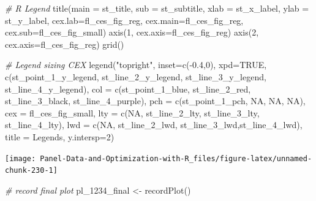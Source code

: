 \documentclass[
]{book}
\newenvironment{Shaded}{\begin{snugshade}}{\end{snugshade}}
\newcommand{\AttributeTok}[1]{\textcolor[rgb]{0.77,0.63,0.00}{#1}}
\newcommand{\CommentTok}[1]{\textcolor[rgb]{0.56,0.35,0.01}{\textit{#1}}}
\newcommand{\ConstantTok}[1]{\textcolor[rgb]{0.00,0.00,0.00}{#1}}
\newcommand{\DecValTok}[1]{\textcolor[rgb]{0.00,0.00,0.81}{#1}}
\newcommand{\FloatTok}[1]{\textcolor[rgb]{0.00,0.00,0.81}{#1}}
\newcommand{\FunctionTok}[1]{\textcolor[rgb]{0.00,0.00,0.00}{#1}}
\newcommand{\NormalTok}[1]{#1}
\newcommand{\OtherTok}[1]{\textcolor[rgb]{0.56,0.35,0.01}{#1}}
\newcommand{\SpecialCharTok}[1]{\textcolor[rgb]{0.00,0.00,0.00}{#1}}
\newcommand{\StringTok}[1]{\textcolor[rgb]{0.31,0.60,0.02}{#1}}
\begin{document}
\begin{Shaded}
\begin{Highlighting}[]
\CommentTok{\# R Legend}
\FunctionTok{title}\NormalTok{(}\AttributeTok{main =}\NormalTok{ st\_title, }\AttributeTok{sub =}\NormalTok{ st\_subtitle, }\AttributeTok{xlab =}\NormalTok{ st\_x\_label, }\AttributeTok{ylab =}\NormalTok{ st\_y\_label,}
      \AttributeTok{cex.lab=}\NormalTok{fl\_ces\_fig\_reg,}
      \AttributeTok{cex.main=}\NormalTok{fl\_ces\_fig\_reg,}
      \AttributeTok{cex.sub=}\NormalTok{fl\_ces\_fig\_small)}
\FunctionTok{axis}\NormalTok{(}\DecValTok{1}\NormalTok{, }\AttributeTok{cex.axis=}\NormalTok{fl\_ces\_fig\_reg)}
\FunctionTok{axis}\NormalTok{(}\DecValTok{2}\NormalTok{, }\AttributeTok{cex.axis=}\NormalTok{fl\_ces\_fig\_reg)}
\FunctionTok{grid}\NormalTok{()}

\CommentTok{\# Legend sizing CEX}
\FunctionTok{legend}\NormalTok{(}\StringTok{"topright"}\NormalTok{,}
       \AttributeTok{inset=}\FunctionTok{c}\NormalTok{(}\SpecialCharTok{{-}}\FloatTok{0.4}\NormalTok{,}\DecValTok{0}\NormalTok{),}
       \AttributeTok{xpd=}\ConstantTok{TRUE}\NormalTok{,}
       \FunctionTok{c}\NormalTok{(st\_point\_1\_y\_legend, st\_line\_2\_y\_legend, st\_line\_3\_y\_legend, st\_line\_4\_y\_legend),}
       \AttributeTok{col =} \FunctionTok{c}\NormalTok{(st\_point\_1\_blue, st\_line\_2\_red, st\_line\_3\_black, st\_line\_4\_purple),}
       \AttributeTok{pch =} \FunctionTok{c}\NormalTok{(st\_point\_1\_pch, }\ConstantTok{NA}\NormalTok{, }\ConstantTok{NA}\NormalTok{, }\ConstantTok{NA}\NormalTok{),}
       \AttributeTok{cex =}\NormalTok{ fl\_ces\_fig\_small,}
       \AttributeTok{lty =} \FunctionTok{c}\NormalTok{(}\ConstantTok{NA}\NormalTok{, st\_line\_2\_lty, st\_line\_3\_lty, st\_line\_4\_lty),}
       \AttributeTok{lwd =} \FunctionTok{c}\NormalTok{(}\ConstantTok{NA}\NormalTok{, st\_line\_2\_lwd, st\_line\_3\_lwd,st\_line\_4\_lwd),}
       \AttributeTok{title =} \StringTok{\textquotesingle{}Legends\textquotesingle{}}\NormalTok{,}
       \AttributeTok{y.intersp=}\DecValTok{2}\NormalTok{)}
\end{Highlighting}
\end{Shaded}

\begin{center}\texttt{[image: Panel-Data-and-Optimization-with-R\_files/figure-latex/unnamed-chunk-230-1]} \end{center}

\begin{Shaded}
\begin{Highlighting}[]
\CommentTok{\# record final plot}
\NormalTok{pl\_1234\_final }\OtherTok{\textless{}{-}} \FunctionTok{recordPlot}\NormalTok{()}
\end{Highlighting}
\end{Shaded}
\end{document}

